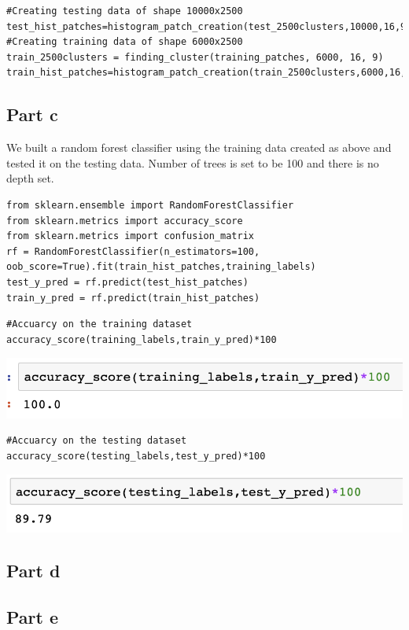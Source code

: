 \documentclass{article}      %
\begin{document}
\begin{enumerate}[label=(\alph*)]
\begin{lstlisting}
#Creating testing data of shape 10000x2500
test_hist_patches=histogram_patch_creation(test_2500clusters,10000,16,9)
#Creating training data of shape 6000x2500
train_2500clusters = finding_cluster(training_patches, 6000, 16, 9)
train_hist_patches=histogram_patch_creation(train_2500clusters,6000,16,9)
\end{lstlisting}
\end{enumerate}

\subsection{Part c}

We built a random forest classifier using the training data created as above and tested it on the testing data. Number of trees is set to be 100 and there is no depth set.

\begin{lstlisting}
from sklearn.ensemble import RandomForestClassifier
from sklearn.metrics import accuracy_score
from sklearn.metrics import confusion_matrix
rf = RandomForestClassifier(n_estimators=100, oob_score=True).fit(train_hist_patches,training_labels)
test_y_pred = rf.predict(test_hist_patches)
train_y_pred = rf.predict(train_hist_patches)
\end{lstlisting}

\begin{lstlisting}
#Accuarcy on the training dataset
accuracy_score(training_labels,train_y_pred)*100
\end{lstlisting}

\includegraphics[width=\textwidth]{trainaccuracy}

\begin{lstlisting}
#Accuarcy on the testing dataset
accuracy_score(testing_labels,test_y_pred)*100
\end{lstlisting}

\includegraphics[width=\textwidth]{testaccuracy}


\subsection{Part d}

\subsection{Part e}







%
\end{document}
